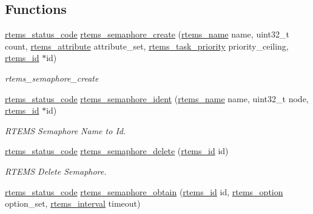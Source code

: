 \subsection*{Functions}
\begin{DoxyCompactItemize}
\item 
\mbox{\hyperlink{group__ClassicStatus_ga545d41846817eaba6143d52ee4d9e9fe}{rtems\+\_\+status\+\_\+code}} \mbox{\hyperlink{group__ClassicSem_ga215ed3e3aa56c2f5204edc629985f2aa}{rtems\+\_\+semaphore\+\_\+create}} (\mbox{\hyperlink{group__ClassicTasks_ga55fb63c49f68c0cbd9bee004da15b1fd}{rtems\+\_\+name}} name, uint32\+\_\+t count, \mbox{\hyperlink{group__ClassicAttributes_gaea40313cf78ed843e09c4315d0a10f79}{rtems\+\_\+attribute}} attribute\+\_\+set, \mbox{\hyperlink{group__ClassicTasks_gaa80a0c0938307d1e99d0eb5fee765b47}{rtems\+\_\+task\+\_\+priority}} priority\+\_\+ceiling, \mbox{\hyperlink{group__ClassicTasks_gab20892b814dced7dd4e5b9bf42becd57}{rtems\+\_\+id}} $\ast$id)
\begin{DoxyCompactList}\small\item\em rtems\+\_\+semaphore\+\_\+create \end{DoxyCompactList}\item 
\mbox{\hyperlink{group__ClassicStatus_ga545d41846817eaba6143d52ee4d9e9fe}{rtems\+\_\+status\+\_\+code}} \mbox{\hyperlink{group__ClassicSem_ga45802f4b10ae5eb68cb073aa7e3f0a11}{rtems\+\_\+semaphore\+\_\+ident}} (\mbox{\hyperlink{group__ClassicTasks_ga55fb63c49f68c0cbd9bee004da15b1fd}{rtems\+\_\+name}} name, uint32\+\_\+t node, \mbox{\hyperlink{group__ClassicTasks_gab20892b814dced7dd4e5b9bf42becd57}{rtems\+\_\+id}} $\ast$id)
\begin{DoxyCompactList}\small\item\em R\+T\+E\+MS Semaphore Name to Id. \end{DoxyCompactList}\item 
\mbox{\hyperlink{group__ClassicStatus_ga545d41846817eaba6143d52ee4d9e9fe}{rtems\+\_\+status\+\_\+code}} \mbox{\hyperlink{group__ClassicSem_gabf9631b7132ab4142eff47a1502652a2}{rtems\+\_\+semaphore\+\_\+delete}} (\mbox{\hyperlink{group__ClassicTasks_gab20892b814dced7dd4e5b9bf42becd57}{rtems\+\_\+id}} id)
\begin{DoxyCompactList}\small\item\em R\+T\+E\+MS Delete Semaphore. \end{DoxyCompactList}\item 
\mbox{\hyperlink{group__ClassicStatus_ga545d41846817eaba6143d52ee4d9e9fe}{rtems\+\_\+status\+\_\+code}} \mbox{\hyperlink{group__ClassicSem_gae8c1795a85f982ceea89e7faf7d68e91}{rtems\+\_\+semaphore\+\_\+obtain}} (\mbox{\hyperlink{group__ClassicTasks_gab20892b814dced7dd4e5b9bf42becd57}{rtems\+\_\+id}} id, \mbox{\hyperlink{group__ClassicOptions_gad26685eb0e60a9650082935c31920e29}{rtems\+\_\+option}} option\+\_\+set, \mbox{\hyperlink{group__ClassicTasks_gad39c43f949683d46874e3a5586b93aee}{rtems\+\_\+interval}} timeout)

\end{DoxyCompactItemize}
